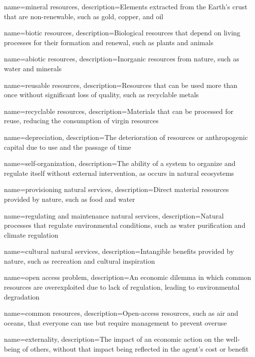 {
	name=mineral resources,
	description={Elements extracted from the Earth’s crust that are non-renewable, such as gold, copper, and oil}
}

{
	name=biotic resources,
	description={Biological resources that depend on living processes for their formation and renewal, such as plants and animals}
}

{
	name=abiotic resources,
	description={Inorganic resources from nature, such as water and minerals}
}

{
	name=reusable resources,
	description={Resources that can be used more than once without significant loss of quality, such as recyclable metals}
}

{
	name=recyclable resources,
	description={Materials that can be processed for reuse, reducing the consumption of virgin resources}
}

{
	name=depreciation,
	description={The deterioration of resources or anthropogenic capital due to use and the passage of time}
}

{
	name=self-organization,
	description={The ability of a system to organize and regulate itself without external intervention, as occurs in natural ecosystems}
}

{
	name=provisioning natural services,
	description={Direct material resources provided by nature, such as food and water}
}

{
	name=regulating and maintenance natural services,
	description={Natural processes that regulate environmental conditions, such as water purification and climate regulation}
}

{
	name=cultural natural services,
	description={Intangible benefits provided by nature, such as recreation and cultural inspiration}
}

{
	name=open access problem,
	description={An economic dilemma in which common resources are overexploited due to lack of regulation, leading to environmental degradation}
}

{
	name=common resources,
	description={Open-access resources, such as air and oceans, that everyone can use but require management to prevent overuse}
}

{
	name=externality,
	description={The impact of an economic action on the well-being of others, without that impact being reflected in the agent’s cost or benefit}
}


